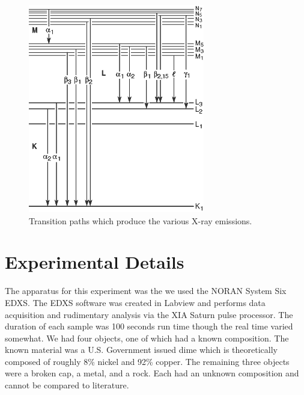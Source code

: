 \documentclass[10pt]{IEEEtran}
\begin{document}
\begin{figure}[t]
       \begin{center}
       \includegraphics[width=\columnwidth]{Sec1201.png}
       \caption{Transition paths which produce the various X-ray emissions.\cite{xdb}}
       \label{fig:paths}
       \end{center}
\end{figure}

\section{Experimental Details}
The apparatus for this experiment was the we used the NORAN System Six EDXS. The EDXS software was created in Labview and performs data acquisition and rudimentary analysis via the XIA Saturn pulse processor. The duration of each sample was 100 seconds run time though the real time varied somewhat. We had four objects, one of which had a known composition. The known material was a U.S. Government issued dime which is theoretically composed of roughly 8\% nickel and 92\% copper\cite{mint}. The remaining three objects were a broken cap, a metal, and a rock. Each had an unknown composition and cannot be compared to literature.
\end{document}
